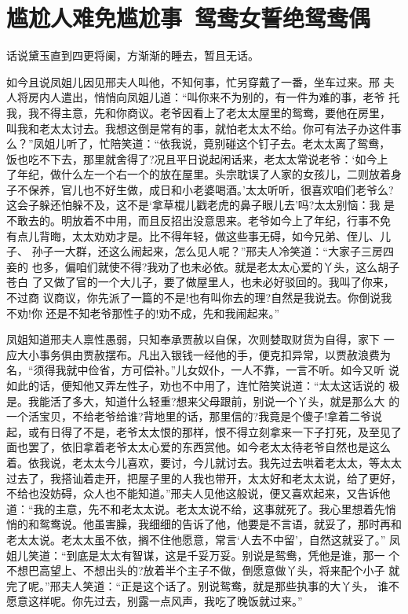 \chapter{尴尬人难免尴尬事~鸳鸯女誓绝鸳鸯偶}

话说黛玉直到四更将阑，方渐渐的睡去，暂且无话。

如今且说凤姐儿因见邢夫人叫他，不知何事，忙另穿戴了一番，坐车过来。邢
夫人将房内人遣出，悄悄向凤姐儿道：“叫你来不为别的，有一件为难的事，老爷
托我，我不得主意，先和你商议。老爷因看上了老太太屋里的鸳鸯，要他在房里，
叫我和老太太讨去。我想这倒是常有的事，就怕老太太不给。你可有法子办这件事
么？”凤姐儿听了，忙陪笑道：“依我说，竟别碰这个钉子去。老太太离了鸳鸯，
饭也吃不下去，那里就舍得了?况且平日说起闲话来，老太太常说老爷：‘如今上
了年纪，做什么左一个右一个的放在屋里。头宗耽误了人家的女孩儿，二则放着身
子不保养，官儿也不好生做，成日和小老婆喝酒。’太太听听，很喜欢咱们老爷么?
这会子躲还怕躲不及，这不是‘拿草棍儿戳老虎的鼻子眼儿去’吗?太太别恼：我
是不敢去的。明放着不中用，而且反招出没意思来。老爷如今上了年纪，行事不免
有点儿背晦，太太劝劝才是。比不得年轻，做这些事无碍，如今兄弟、侄儿、儿子、
孙子一大群，还这么闹起来，怎么见人呢？”邢夫人冷笑道：“大家子三房四妾的
也多，偏咱们就使不得?我劝了也未必依。就是老太太心爱的丫头，这么胡子苍白
了又做了官的一个大儿子，要了做屋里人，也未必好驳回的。我叫了你来，不过商
议商议，你先派了一篇的不是!也有叫你去的理?自然是我说去。你倒说我不劝!你
还是不知老爷那性子的!劝不成，先和我闹起来。”

凤姐知道邢夫人禀性愚弱，只知奉承贾赦以自保，次则婪取财货为自得，家下
一应大小事务俱由贾赦摆布。凡出入银钱一经他的手，便克扣异常，以贾赦浪费为
名，“须得我就中俭省，方可偿补。”儿女奴仆，一人不靠，一言不听。如今又听
说如此的话，便知他又弄左性子，劝也不中用了，连忙陪笑说道：“太太这话说的
极是。我能活了多大，知道什么轻重?想来父母跟前，别说一个丫头，就是那么大
的一个活宝贝，不给老爷给谁?背地里的话，那里信的?我竟是个傻子!拿着二爷说
起，或有日得了不是，老爷太太恨的那样，恨不得立刻拿来一下子打死，及至见了
面也罢了，依旧拿着老爷太太心爱的东西赏他。如今老太太待老爷自然也是这么
着。依我说，老太太今儿喜欢，要讨，今儿就讨去。我先过去哄着老太太，等太太
过去了，我搭讪着走开，把屋子里的人我也带开，太太好和老太太说，给了更好，
不给也没妨碍，众人也不能知道。”邢夫人见他这般说，便又喜欢起来，又告诉他
道：“我的主意，先不和老太太说。老太太说不给，这事就死了。我心里想着先悄
悄的和鸳鸯说。他虽害臊，我细细的告诉了他，他要是不言语，就妥了，那时再和
老太太说。老太太虽不依，搁不住他愿意，常言‘人去不中留’，自然这就妥了。”
凤姐儿笑道：“到底是太太有智谋，这是千妥万妥。别说是鸳鸯，凭他是谁，那一
个不想巴高望上、不想出头的?放着半个主子不做，倒愿意做丫头，将来配个小子
就完了呢。”邢夫人笑道：“正是这个话了。别说鸳鸯，就是那些执事的大丫头，
谁不愿意这样呢。你先过去，别露一点风声，我吃了晚饭就过来。”

